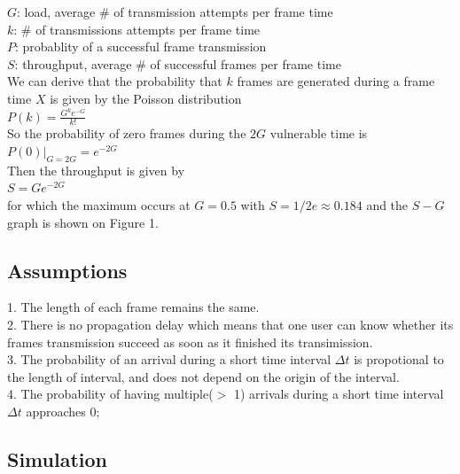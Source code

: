 \documentclass[11pt,a4paper]{report}
\begin{document}
\qquad	\(G\): load, average \# of transmission attempts per frame time \\

\qquad	\(k\): \# of transmissions attempts per frame time \\

\qquad	\(P\): probablity of a successful frame transmission \\

\qquad	\(S\): throughput, average \# of successful frames per frame time \\

We can derive that the probability that \(k\) frames are generated during a frame time \(X\) is given by the Poisson distribution \\

\qquad	\(P(k) = \frac{G^ke^{-G}}{k!}\) \\

So the probability of zero frames during the \(2G\) vulnerable time is \\

\qquad \(P(0)|_{G=2G} = e^{-2G}\) \\

Then the throughput is given by \\

\qquad \(S = Ge^{-2G}\) \\

for which the maximum occurs at \(G = 0.5\) with \(S = 1/2e \approx 0.184\) and the \(S - G\) graph is shown on Figure 1.

\subsection*{Assumptions}

1. The length of each frame remains the same. \\
2. There is no propagation delay which means that one user can know whether its frames transmission succeed as soon as it finished its transimission. \\
3. The probability of an arrival during a short time interval \(\Delta t\) is propotional to the length of interval, and does not depend on the origin of the interval. \\
4. The probability of having multiple(\(>\) 1) arrivals during a short time interval \(\Delta t\) approaches 0;

\subsection*{Simulation}
\end{document}
